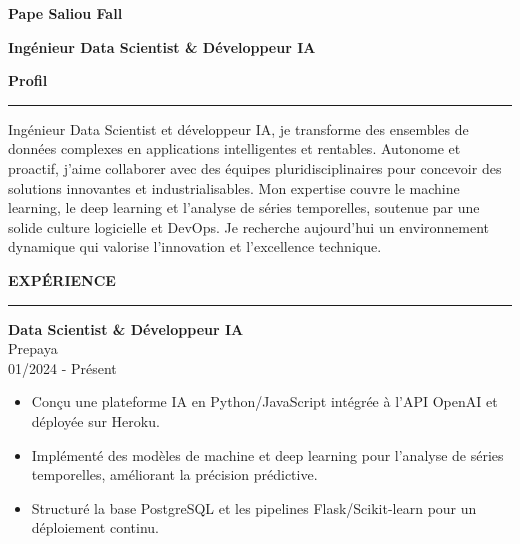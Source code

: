 \documentclass{article}
\newcommand{\cvsection}[1]{%
  \par\bigskip                %
  {\bfseries\Large #1}\par
  \noindent\rule{\linewidth}{0.8pt}\par
  \medskip                    %
}
\newcommand*{\ClipSep}{0.4cm}
\begin{document}
\pagestyle{empty}
\begin{paracol}{2}

\begin{minipage}{0.7\linewidth}
{\LARGE\textbf{Pape Saliou Fall}}

\bigskip
{\large\textbf{Ingénieur Data Scientist \& Développeur IA}}
\end{minipage}\hfill
\begin{minipage}{0.18\linewidth}
\end{minipage}

\cvsection{Profil}
Ingénieur Data Scientist et développeur IA, je transforme des ensembles de données complexes en applications intelligentes et rentables. Autonome et proactif, j’aime collaborer avec des équipes pluridisciplinaires pour concevoir des solutions innovantes et industrialisables. Mon expertise couvre le machine learning, le deep learning et l’analyse de séries temporelles, soutenue par une solide culture logicielle et DevOps. Je recherche aujourd’hui un environnement dynamique qui valorise l’innovation et l’excellence technique.

\cvsection{EXPÉRIENCE}

\colorbox{maincolor}{%
  \begin{minipage}{\linewidth}
    \textbf{Data Scientist \& Développeur IA} \\ Prepaya \\ 01/2024 - Présent
    \begin{itemize}
      \item Conçu une plateforme IA en Python/JavaScript intégrée à l’API OpenAI et déployée sur Heroku. \item Implémenté des modèles de machine et deep learning pour l’analyse de séries temporelles, améliorant la précision prédictive. \item Structuré la base PostgreSQL et les pipelines Flask/Scikit-learn pour un déploiement continu.
    \end{itemize}
  \end{minipage}}


\end{paracol}
\end{document}
